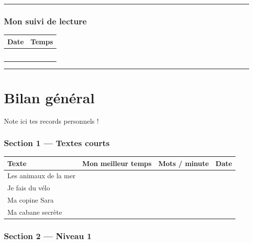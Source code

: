 \documentclass[
  french,
  14pt,
  a4paper,
]{extarticle}
\newcounter{none} %
\begin{document}
\begin{center}\rule{0.5\linewidth}{0.5pt}\end{center}

\subsubsection{Mon suivi de lecture}\label{mon-suivi-de-lecture-15}

\begin{center}
\begin{tabularx}{0.75\textwidth}{|X|X|}
\hline
\textbf{Date} & \textbf{Temps} \\
\hline
& \\
\hline
& \\
\hline
& \\
\hline
& \\
\hline
& \\
\hline
\end{tabularx}
\end{center}

\begin{center}\rule{0.5\linewidth}{0.5pt}\end{center}

\newpage

\section{Bilan général}\label{bilan-guxe9nuxe9ral}

Note ici tes records personnels !

\subsubsection{Section 1 --- Textes
courts}\label{section-1-textes-courts-1}

{\def\LTcaptype{none} %
\begin{longtable}[]{@{}llll@{}}
\toprule\noalign{}
Texte & Mon meilleur temps & Mots / minute & Date \\
\midrule\noalign{}
\endhead
\bottomrule\noalign{}
\endlastfoot
Les animaux de la mer & & & \\
Je fais du vélo & & & \\
Ma copine Sara & & & \\
Ma cabane secrète & & & \\
\end{longtable}
}

\subsubsection{Section 2 --- Niveau 1}\label{section-2-niveau-1-1}
\end{document}
